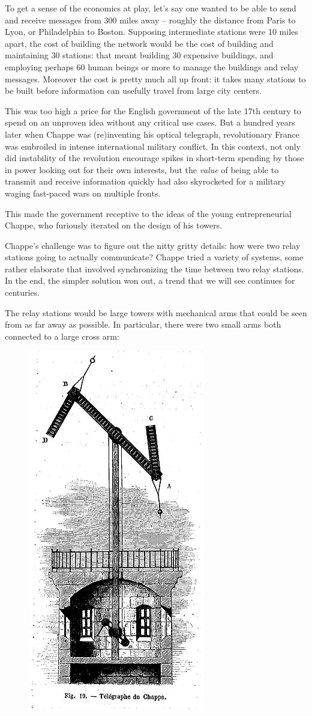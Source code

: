 \documentclass{book}
\begin{document}
To get a sense of the economics at play, let's say one wanted to be able to send and receive messages from 300 miles away – roughly the distance from Paris to Lyon, or Philadelphia to Boston. Supposing intermediate stations were 10 miles apart, the cost of building the network would be the cost of building and maintaining 30 stations: that meant building 30 expensive buildings, and employing perhaps 60 human beings or more to manage the buildings and relay messages. Moreover the cost is pretty much all up front: it takes many stations to be built before information can usefully travel from large city centers.

This was too high a price for the English government of the late 17th century to spend on an unproven idea without any critical use cases. But a hundred years later when Chappe was (re)inventing his optical telegraph, revolutionary France was embroiled in intense international military conflict. In this context, not only did instability of the revolution encourage spikes in short-term spending by those in power looking out for their own interests, but the \emph{value} of being able to transmit and receive information quickly had also skyrocketed for a military waging fast-paced wars on multiple fronts.

This made the government receptive to the ideas of the young entrepreneurial Chappe, who furiously iterated on the design of his towers.

Chappe's challenge was to figure out the nitty gritty details: how were two relay stations going to actually communicate? Chappe tried a variety of systems, some rather elaborate that involved synchronizing the time between two relay stations. In the end, the simpler solution won out, a trend that we will see continues for centuries.

The relay stations would be large towers with mechanical arms that could be seen from as far away as possible. In particular, there were two small arms both connected to a large cross arm:

\begin{figure}[H]
\centering
\includegraphics[width=0.3\linewidth]{chappe_tower}
\end{figure}
\end{document}
